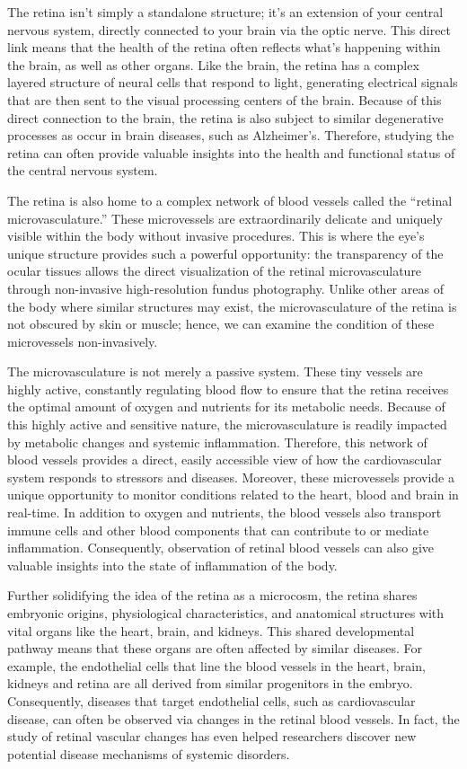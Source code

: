\documentclass[
  Letterpaper,
]{scrbook}
\begin{document}
The retina isn't simply a standalone structure; it's an extension of
your central nervous system, directly connected to your brain via the
optic nerve. This direct link means that the health of the retina often
reflects what's happening within the brain, as well as other organs.
Like the brain, the retina has a complex layered structure of neural
cells that respond to light, generating electrical signals that are then
sent to the visual processing centers of the brain. Because of this
direct connection to the brain, the retina is also subject to similar
degenerative processes as occur in brain diseases, such as Alzheimer's.
Therefore, studying the retina can often provide valuable insights into
the health and functional status of the central nervous system.

The retina is also home to a complex network of blood vessels called the
``retinal microvasculature.'' These microvessels are extraordinarily
delicate and uniquely visible within the body without invasive
procedures. This is where the eye's unique structure provides such a
powerful opportunity: the transparency of the ocular tissues allows the
direct visualization of the retinal microvasculature through
non-invasive high-resolution fundus photography. Unlike other areas of
the body where similar structures may exist, the microvasculature of the
retina is not obscured by skin or muscle; hence, we can examine the
condition of these microvessels non-invasively.

The microvasculature is not merely a passive system. These tiny vessels
are highly active, constantly regulating blood flow to ensure that the
retina receives the optimal amount of oxygen and nutrients for its
metabolic needs. Because of this highly active and sensitive nature, the
microvasculature is readily impacted by metabolic changes and systemic
inflammation. Therefore, this network of blood vessels provides a
direct, easily accessible view of how the cardiovascular system responds
to stressors and diseases. Moreover, these microvessels provide a unique
opportunity to monitor conditions related to the heart, blood and brain
in real-time. In addition to oxygen and nutrients, the blood vessels
also transport immune cells and other blood components that can
contribute to or mediate inflammation. Consequently, observation of
retinal blood vessels can also give valuable insights into the state of
inflammation of the body.

Further solidifying the idea of the retina as a microcosm, the retina
shares embryonic origins, physiological characteristics, and anatomical
structures with vital organs like the heart, brain, and kidneys. This
shared developmental pathway means that these organs are often affected
by similar diseases. For example, the endothelial cells that line the
blood vessels in the heart, brain, kidneys and retina are all derived
from similar progenitors in the embryo. Consequently, diseases that
target endothelial cells, such as cardiovascular disease, can often be
observed via changes in the retinal blood vessels. In fact, the study of
retinal vascular changes has even helped researchers discover new
potential disease mechanisms of systemic disorders.
\end{document}
